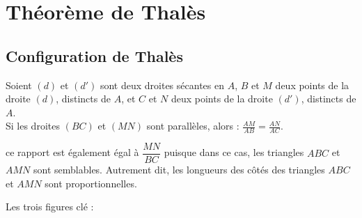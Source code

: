 \cours

\section{Théorème de Thalès}

\subsection{Configuration de Thalès}

\begin{propriete}
   Soient $(d)$ et $(d')$ sont deux droites sécantes en $A$, $B$ et $M$ deux points de la droite $(d)$, distincts de $A$, et $C$ et $N$ deux points de la droite $(d')$, distincts de $A$. \\
   Si les droites $(BC)$ et $(MN)$ sont parallèles, alors : $\displaystyle{\frac{AM}{AB}=\frac{AN}{AC}}$.
\end{propriete}

\begin{remarque}
   ce rapport est également égal à $\dfrac{MN}{BC}$ puisque dans ce cas, les triangles $ABC$ et $AMN$ sont semblables. Autrement dit, les longueurs des côtés des triangles $ABC$ et $AMN$ sont proportionnelles.
\end{remarque}

Les trois figures clé :

